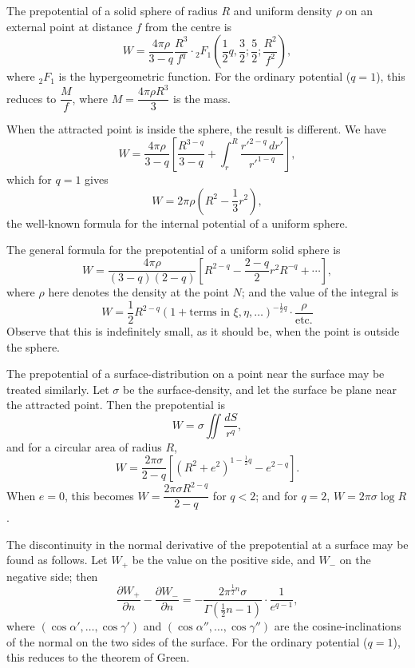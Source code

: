 \documentclass[11pt,a4paper]{book}
\begin{document}
\begin{art}
The prepotential of a solid sphere of radius $R$ and uniform density $\rho$ on an external point at distance $f$ from the centre is
\[
W = \frac{4\pi\rho}{3-q}\frac{R^3}{f^q} \cdot {}_2F_1\left(\frac{1}{2}q, \frac{3}{2}; \frac{5}{2}; \frac{R^2}{f^2}\right),
\]
where ${}_2F_1$ is the hypergeometric function. For the ordinary potential ($q=1$), this reduces to $\dfrac{M}{f}$, where $M = \dfrac{4\pi\rho R^3}{3}$ is the mass.
\end{art}

\begin{art}
When the attracted point is inside the sphere, the result is different. We have
\[
W = \frac{4\pi\rho}{3-q}\left[\frac{R^{3-q}}{3-q} + \int_r^R \frac{r'^{2-q}\,dr'}{r'^{1-q}}\right],
\]
which for $q=1$ gives
\[
W = 2\pi\rho\left(R^2 - \frac{1}{3}r^2\right),
\]
the well-known formula for the internal potential of a uniform sphere.
\end{art}

\begin{art}
The general formula for the prepotential of a uniform solid sphere is
\[
W = \frac{4\pi\rho}{(3-q)(2-q)}\left[R^{2-q} - \frac{2-q}{2}r^2 R^{-q} + \cdots\right],
\]
where $\rho$ here denotes the density at the point $N$; and the value of the integral is
\[
W = \frac{1}{2}R^{2-q}(1 + \text{terms in } \xi, \eta, \ldots)^{-\frac{1}{2}q} \cdot \frac{\rho}{\text{etc.}}
\]
Observe that this is indefinitely small, as it should be, when the point is outside the sphere.
\end{art}

\begin{art}
The prepotential of a surface-distribution on a point near the surface may be treated similarly. Let $\sigma$ be the surface-density, and let the surface be plane near the attracted point. Then the prepotential is
\[
W = \sigma \iint \frac{dS}{r^q},
\]
and for a circular area of radius $R$,
\[
W = \frac{2\pi\sigma}{2-q}\left[(R^2+e^2)^{1-\frac{1}{2}q} - e^{2-q}\right].
\]
When $e = 0$, this becomes $W = \dfrac{2\pi\sigma R^{2-q}}{2-q}$ for $q < 2$; and for $q = 2$, $W = 2\pi\sigma\log R$.
\end{art}

\begin{art}
The discontinuity in the normal derivative of the prepotential at a surface may be found as follows. Let $W_+$ be the value on the positive side, and $W_-$ on the negative side; then
\[
\frac{\partial W_+}{\partial n} - \frac{\partial W_-}{\partial n} = -\frac{2\pi^{\frac{1}{2}n}\sigma}{\Gamma(\frac{1}{2}n - 1)} \cdot \frac{1}{e^{q-1}},
\]
where $(\cos\alpha', \ldots, \cos\gamma')$ and $(\cos\alpha'', \ldots, \cos\gamma'')$ are the cosine-inclinations of the normal on the two sides of the surface. For the ordinary potential ($q=1$), this reduces to the theorem of Green.
\end{art}
\end{document}
